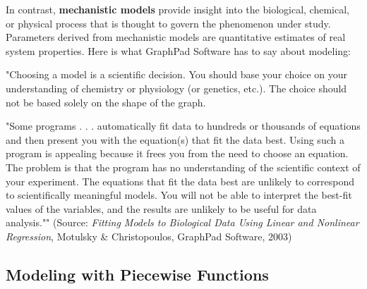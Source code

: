 \documentclass[10pt,]{book}
\newcommand{\terminology}[1]{\textbf{#1}}
\theoremstyle{plain}
\theoremstyle{definition}
\theoremstyle{definition}
\numberwithin{equation}{section}
\begin{document}
    In contrast, \terminology{mechanistic models} provide insight into the biological, chemical, or physical process that is thought to govern the phenomenon under study. Parameters derived from mechanistic models are quantitative estimates of real system properties. Here is what GraphPad Software has to say about modeling:
%
\par

    "Choosing a model is a scientific decision. You should base your choice on your understanding of chemistry or physiology (or genetics, etc.). The choice should not be based solely on the shape of the graph.
%
\par

    "Some programs . . . automatically fit data to hundreds or thousands of equations and then present you with the equation(s) that fit the data best. Using such a program is appealing because it frees you from the need to choose an equation. The problem is that the program has no understanding of the scientific context of your experiment. The equations that fit the data best are unlikely to correspond to scientifically meaningful models. You will not be able to interpret the best-fit values of the variables, and the results are unlikely to be useful for data analysis."" (Source: \emph{Fitting Models to Biological Data Using Linear and Nonlinear Regression}, Motulsky \& Christopoulos, GraphPad Software, 2003)
%
\typeout{************************************************}
\typeout{************************************************}
\subsection[Modeling with Piecewise Functions]{Modeling with Piecewise Functions}\label{subsection-47}
\end{document}

